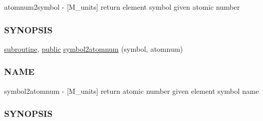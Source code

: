 \begin{DoxyCompactItemize}
\begin{DoxyCompactList}
atomnum2symbol -\/ \mbox{[}M\+\_\+units\mbox{]} return element symbol given atomic number \subsubsection*{S\+Y\+N\+O\+P\+S\+IS}\end{DoxyCompactList}\item 
\hyperlink{M__stopwatch_83_8txt_acfbcff50169d691ff02d4a123ed70482}{subroutine}, \hyperlink{M__stopwatch_83_8txt_a2f74811300c361e53b430611a7d1769f}{public} \hyperlink{namespacem__units_ad6861fff0b83942a7e6b35a274bf2e09}{symbol2atomnum} (symbol, atomnum)
\begin{DoxyCompactList}\small\item\em \subsubsection*{N\+A\+ME}

symbol2atomnum -\/ \mbox{[}M\+\_\+units\mbox{]} return atomic number given element symbol name \subsubsection*{S\+Y\+N\+O\+P\+S\+IS}\end{DoxyCompactList}\end{DoxyCompactItemize}
